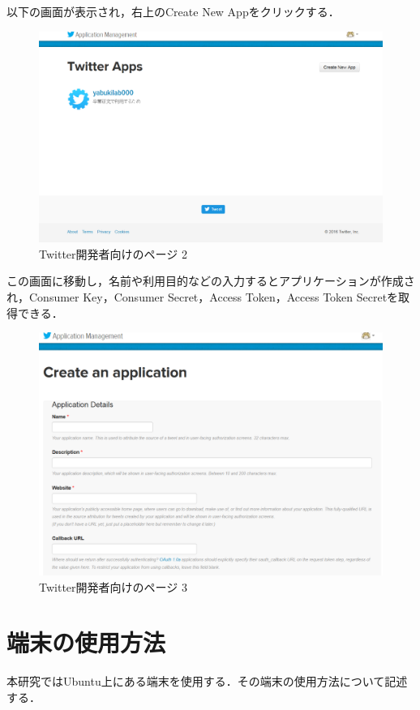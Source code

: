 以下の画面が表示され，右上のCreate New Appをクリックする．

\begin{figure}[H]
\centering
\includegraphics[width=15cm]{twitterdev002.png}
\caption{Twitter開発者向けのページ 2}\label{Twitter開発者向けページ 2}
\end{figure}

この画面に移動し，名前や利用目的などの入力するとアプリケーションが作成され，Consumer Key，Consumer Secret，Access Token，Access Token Secretを取得できる．


\begin{figure}[H]
\centering
\includegraphics[width=15cm]{twitterdev003.png}
\caption{Twitter開発者向けのページ 3}\label{Twitter開発者向けページ 3}
\end{figure}

\section{端末の使用方法}
本研究ではUbuntu上にある端末を使用する．その端末の使用方法について記述する．

